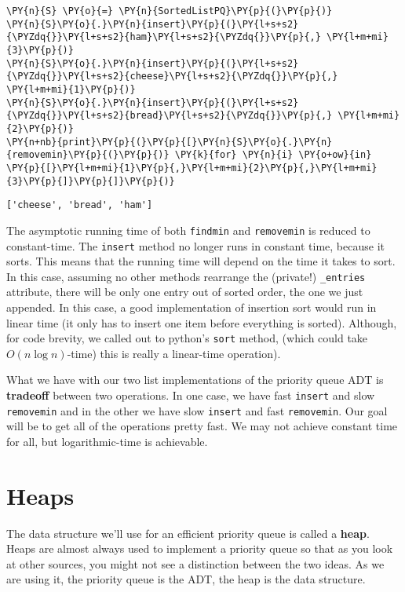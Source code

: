 \begin{Verbatim}[commandchars=\\\{\}]
\PY{n}{S} \PY{o}{=} \PY{n}{SortedListPQ}\PY{p}{(}\PY{p}{)}
\PY{n}{S}\PY{o}{.}\PY{n}{insert}\PY{p}{(}\PY{l+s+s2}{\PYZdq{}}\PY{l+s+s2}{ham}\PY{l+s+s2}{\PYZdq{}}\PY{p}{,} \PY{l+m+mi}{3}\PY{p}{)}
\PY{n}{S}\PY{o}{.}\PY{n}{insert}\PY{p}{(}\PY{l+s+s2}{\PYZdq{}}\PY{l+s+s2}{cheese}\PY{l+s+s2}{\PYZdq{}}\PY{p}{,} \PY{l+m+mi}{1}\PY{p}{)}
\PY{n}{S}\PY{o}{.}\PY{n}{insert}\PY{p}{(}\PY{l+s+s2}{\PYZdq{}}\PY{l+s+s2}{bread}\PY{l+s+s2}{\PYZdq{}}\PY{p}{,} \PY{l+m+mi}{2}\PY{p}{)}
\PY{n+nb}{print}\PY{p}{(}\PY{p}{[}\PY{n}{S}\PY{o}{.}\PY{n}{removemin}\PY{p}{(}\PY{p}{)} \PY{k}{for} \PY{n}{i} \PY{o+ow}{in} \PY{p}{[}\PY{l+m+mi}{1}\PY{p}{,}\PY{l+m+mi}{2}\PY{p}{,}\PY{l+m+mi}{3}\PY{p}{]}\PY{p}{]}\PY{p}{)}
\end{Verbatim}

\begin{Verbatim}
['cheese', 'bread', 'ham']

\end{Verbatim}


The asymptotic running time of both \texttt{findmin} and \texttt{removemin} is reduced to constant-time.  The \texttt{insert} method no longer runs in constant time, because it sorts.  This means that the running time will depend on the time it takes to sort.  In this case, assuming no other methods rearrange the (private!) \texttt{\_entries} attribute, there will be only one entry out of sorted order, the one we just appended.  In this case, a good implementation of insertion sort would run in linear time (it only has to insert one item before everything is sorted).  Although, for code brevity, we called out to python's \texttt{sort} method, (which could take $O(n \log n)$-time) this is really a linear-time operation).


What we have with our two list implementations of the priority queue ADT is \textbf{tradeoff} between two operations.  In one case, we have fast \texttt{insert} and slow \texttt{removemin} and in the other we have slow \texttt{insert} and fast \texttt{removemin}.  Our goal will be to get all of the operations pretty fast.  We may not achieve constant time for all, but logarithmic-time is achievable.

\section{Heaps}


The data structure we'll use for an efficient priority queue is called a \textbf{heap}.  Heaps are almost always used to implement a priority queue so that as you look at other sources, you might not see a distinction between the two ideas.  As we are using it, the priority queue is the ADT, the heap is the data structure.  


